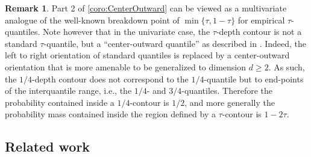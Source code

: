 \documentclass[11pt]{article}
\theoremstyle{plain}
\theoremstyle{definition}
\newtheorem{remark}[sectioncount]{Remark}
\begin{document}
 \begin{remark} Part 2 of \autoref{coro:CenterOutward} can be viewed as a multivariate analogue of the well-known breakdown point of $\min\{\tau, 1-\tau\}$ for empirical $\tau$-quantiles. Note however that in the univariate case, the $\tau$-depth contour is not a standard $\tau$-quantile, but a ``center-outward quantile'' as described in \cite{HallinDelBarrioCuestaAlbertosMatran.21}. Indeed, the left to right orientation of standard quantiles is replaced by a center-outward orientation that is more amenable to be generalized to dimension $d\geq 2$. As such, the $1/4$-depth contour does not correspond to the $1/4$-quantile but to end-points of the interquantile range, i.e., the $1/4$- and $3/4$-quantiles. Therefore the probability contained inside a $1/4$-contour is $1/2$, and more generally the probability mass contained inside the region defined by a $\tau$-contour is $1-2\tau$.      
 \end{remark}
 



\subsection{Related work}
\end{document}
